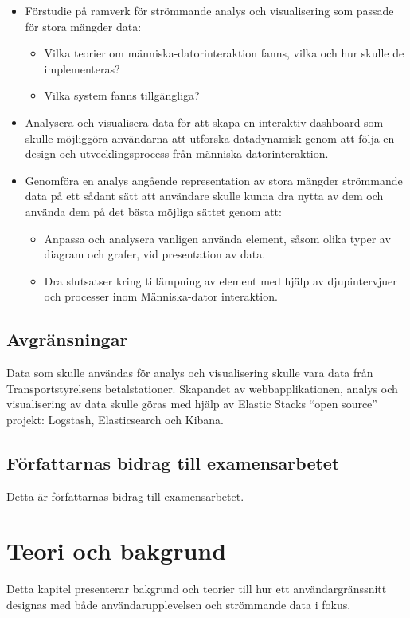 \documentclass{kththesis}
\begin{document}
\begin{itemize}
\item Förstudie på ramverk för strömmande analys och visualisering som passade för stora mängder data:
\begin{itemize}
\item Vilka teorier om människa-datorinteraktion fanns, vilka och hur skulle de implementeras?
\item Vilka system fanns tillgängliga?
\end{itemize}
\item Analysera och visualisera data för att skapa en interaktiv dashboard som skulle möjliggöra användarna att utforska datadynamisk genom att följa en design och utvecklingsprocess från människa-datorinteraktion.
\item Genomföra en analys angående representation av stora mängder strömmande data på ett sådant sätt att användare skulle kunna dra nytta av dem och använda dem på det bästa möjliga sättet genom att:
\begin{itemize}
\item Anpassa och analysera vanligen använda element, såsom olika typer av diagram och grafer, vid presentation av data.
\item Dra slutsatser kring tillämpning av element med hjälp av djupintervjuer och processer inom Människa-dator interaktion.
\end{itemize}
\end{itemize} 

\section{Avgränsningar}
Data som skulle användas för analys och visualisering skulle vara data från Transportstyrelsens betalstationer. Skapandet av webbapplikationen, analys och visualisering av data skulle göras med hjälp av Elastic Stacks “open source” projekt: Logstash, Elasticsearch och Kibana. 


\section{Författarnas bidrag till examensarbetet}
Detta är författarnas bidrag till examensarbetet.


\chapter{Teori och bakgrund}

Detta kapitel presenterar bakgrund och teorier till hur ett användargränssnitt designas med både användarupplevelsen och strömmande data i fokus. 
\end{document}
